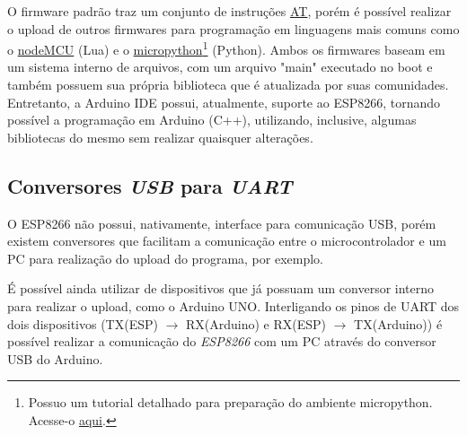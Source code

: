 \documentclass[
12pt,				%
openany,			%
twoside,			%
a4paper,			%
english,			%
french,				%
spanish,			%
brazil,				%
]{abntex2}
\begin{document}
O firmware padrão traz um conjunto de instruções \href{https://www.espressif.com/sites/default/files/documentation/4A-ESP8266_AT_Instruction_Set__EN.pdf}{AT},
porém é possível realizar o upload de outros firmwares para
programação em linguagens mais comuns como o \href{http://nodemcu.com/index_en.html}{nodeMCU} (Lua)
e o \href{https://micropython.org/}{micropython}\footnote{Possuo um tutorial detalhado para preparação do ambiente micropython. Acesse-o \href{https://github.com/GabrielMMelo/esp8266-course}{aqui}.} (Python). Ambos os firmwares baseam em um
sistema interno de arquivos, com um arquivo "main" executado no boot e também possuem sua própria biblioteca que é atualizada por suas comunidades. Entretanto, a Arduino IDE possui, atualmente, suporte ao ESP8266, tornando possível a programação
em Arduino (C++), utilizando, inclusive, algumas bibliotecas do
mesmo sem realizar quaisquer alterações.

\subsection{Conversores \textit{USB} para \textit{UART}}
O ESP8266 não possui, nativamente, interface para comunicação USB, porém existem conversores que facilitam a comunicação entre o microcontrolador e um PC para realização do upload do programa, por exemplo. 

É possível ainda utilizar de dispositivos que já possuam um conversor interno para realizar o upload, como o Arduino UNO. Interligando os pinos de UART dos dois dispositivos (TX(ESP) $\rightarrow$ RX(Arduino) e RX(ESP) $\rightarrow$ TX(Arduino)) é possível realizar a comunicação do \textit{ESP8266} com um PC através do conversor USB do Arduino.

\vspace{10pt}
\end{document}
